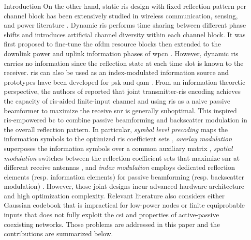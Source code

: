 \documentclass[journal]{IEEEtran}
\begin{document}
\begin{section}{Introduction}
	On the other hand, static \gls{ris} design with fixed reflection pattern per channel block has been extensively studied in wireless communication, sensing, and power literature \cite{Wu2018,Zhang2019a,Lin2022,Liu2022,Feng2022,Zhao2022}.
	Dynamic \gls{ris} performs time sharing between different phase shifts and introduces artificial channel diversity within each channel block.
	It was first proposed to fine-tune the \gls{ofdm} resource blocks \cite{Yang2020} then extended to the downlink power and uplink information phases of \gls{wpcn} \cite{Wu2021,Wu2021d,Hua2022a}.
	However, dynamic \gls{ris} carries no information since the reflection state at each time slot is known to the receiver.
	\gls{ris} can also be used as an index-modulated information source and prototypes have been developed for \gls{psk} \cite{Tang2019a} and \gls{qam} \cite{Dai2020a}.
	From an information-theoretic perspective, the authors of \cite{Karasik2020} reported that joint transmitter-\gls{ris} encoding achieves the capacity of \gls{ris}-aided finite-input channel and using \gls{ris} as a naive passive beamformer to maximize the receive \gls{snr} is generally suboptimal.
	This inspired \gls{ris}-empowered \gls{bc} \cite{Liu2019d,Bereyhi2020,Xu2020b,Zhang2021d,Hu2021b,Hua2022,Basar2020,Ma2020a,Yuan2021,Hu2021a} to combine passive beamforming and backscatter modulation in the overall reflection pattern.
	In particular, \emph{symbol level precoding} maps the information symbols to the optimized \gls{ris} coefficient sets \cite{Liu2019d,Bereyhi2020}, \emph{overlay modulation} superposes the information symbols over a common auxiliary matrix \cite{Xu2020b,Zhang2021d,Hu2021b,Hua2022}, \emph{spatial modulation} switches between the reflection coefficient sets that maximize \gls{snr} at different receive antennas \cite{Basar2020,Ma2020a,Yuan2021}, and \emph{index modulation} employs dedicated reflection elements (resp. information elements) for passive beamforming (resp. backscatter modulation) \cite{Hu2021a}.
	However, those joint designs incur advanced hardware architecture and high optimization complexity.
	Relevant literature also considers either Gaussian codebook \cite{Guo2019b,Ding2020,Long2020a,Zhou2019a,Wu2021a,Xu2021a,Yang2021a,Hu2021b} that is impractical for low-power nodes or finite equiprobable inputs \cite{Yang2018,Liang2020,Han2021,Zhang2022,Liu2019d,Bereyhi2020,Xu2020b,Zhang2021d,Hua2022,Basar2020,Ma2020a,Yuan2021,Hu2021a} that does not fully exploit the \gls{csi} and properties of active-passive coexisting networks.
	Those problems are addressed in this paper and the contributions are summarized below.


\end{section}
\end{document}
